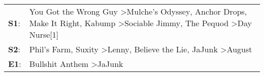 \begin{supertabular}{p{0.03\textwidth}p{0.92\textwidth}}
 \textbf{S1}:  &  You Got the Wrong Guy\textsuperscript{} \textgreater \enspace Mulche's Odyssey\textsuperscript{}, \enspace Anchor Drops\textsuperscript{}, \enspace Make It Right\textsuperscript{}, \enspace Kabump\textsuperscript{} \textgreater \enspace Sociable Jimmy\textsuperscript{}, \enspace The Pequod\textsuperscript{} \textgreater \enspace Day Nurse[1]\textsuperscript{}  \enspace  \\
 \textbf{S2}:  &                                                                                                                               Phil's Farm\textsuperscript{}, \enspace Suxity\textsuperscript{} \textgreater \enspace Lenny\textsuperscript{}, \enspace Believe the Lie\textsuperscript{}, \enspace JaJunk\textsuperscript{} \textgreater \enspace August\textsuperscript{}  \enspace  \\
 \textbf{E1}:  &                                                                                                                                                                                                                                                                                           Bullshit Anthem\textsuperscript{} \textgreater \enspace JaJunk\textsuperscript{}  \enspace  \\
\end{supertabular}
